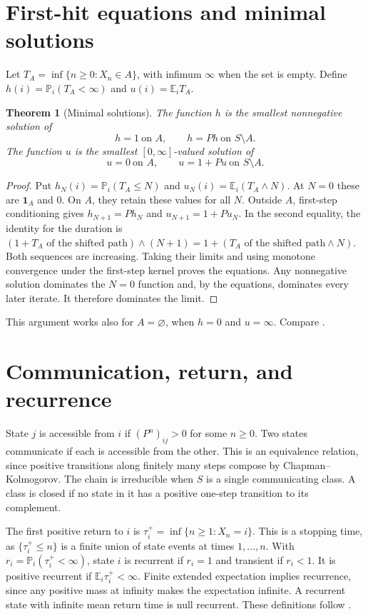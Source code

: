 \documentclass[11pt,oneside,openany]{book}
\theoremstyle{plain}
\newtheorem{theorem}{Theorem}[chapter]
\theoremstyle{definition}
\theoremstyle{remark}
\begin{document}
\section{First-hit equations and minimal solutions}\label{p207:W08}

Let \(T_A=\inf\{n\ge0:X_n\in A\}\), with infimum \(\infty\) when
the set is empty. Define
\(h(i)=\mathbb P_i(T_A<\infty)\) and \(u(i)=\mathbb E_iT_A\).

\begin{theorem}[Minimal solutions]
The function \(h\) is the smallest nonnegative solution of
\[
 h=1\ \text{on }A,\qquad h=Ph\ \text{on }S\setminus A.
\]
The function \(u\) is the smallest \([0,\infty]\)-valued solution of
\[
 u=0\ \text{on }A,\qquad u=1+Pu\ \text{on }S\setminus A.
\]
\end{theorem}
\begin{proof}
Put \(h_N(i)=\mathbb P_i(T_A\le N)\) and
\(u_N(i)=\mathbb E_i(T_A\wedge N)\). At \(N=0\) these are
\(\mathbf{1}_A\) and \(0\). On \(A\), they retain these values
for all \(N\). Outside \(A\), first-step conditioning gives
\(h_{N+1}=Ph_N\) and \(u_{N+1}=1+Pu_N\). In the second equality,
the identity for the duration is
\((1+T_A\text{ of the shifted path})\wedge(N+1)
  =1+(T_A\text{ of the shifted path}\wedge N)\).
Both sequences are increasing. Taking their limits and using
monotone convergence under the first-step kernel proves the
equations. Any nonnegative solution dominates the \(N=0\)
function and, by the equations, dominates every later iterate.
It therefore dominates the limit.
\end{proof}

This argument works also for \(A=\varnothing\), when \(h=0\) and
\(u=\infty\). Compare \cite[Theorems 1.3.2 and 1.3.5]{Norris}.

\section{Communication, return, and recurrence}\label{p207:W09}

State \(j\) is accessible from \(i\) if \((P^n)_{ij}>0\) for some
\(n\ge0\). Two states communicate if each is accessible from the
other. This is an equivalence relation, since positive transitions
along finitely many steps compose by Chapman--Kolmogorov. The chain
is irreducible when \(S\) is a single communicating class.
A class is closed if no state in it has a positive one-step
transition to its complement.

The first positive return to \(i\) is
\(\tau_i^+=\inf\{n\ge1:X_n=i\}\). This is a stopping time, as
\(\{\tau_i^+\le n\}\) is a finite union of state events at times
\(1,\ldots,n\). With \(r_i=\mathbb P_i(\tau_i^+<\infty)\), state \(i\)
is recurrent if \(r_i=1\) and transient if \(r_i<1\).
It is positive recurrent if \(\mathbb E_i\tau_i^+<\infty\).
Finite extended expectation implies recurrence, since any positive
mass at infinity makes the expectation infinite.
A recurrent state with infinite mean return time is null recurrent.
These definitions follow \cite[Sections 1.2, 1.5 and 1.7]{Norris}.
\end{document}
